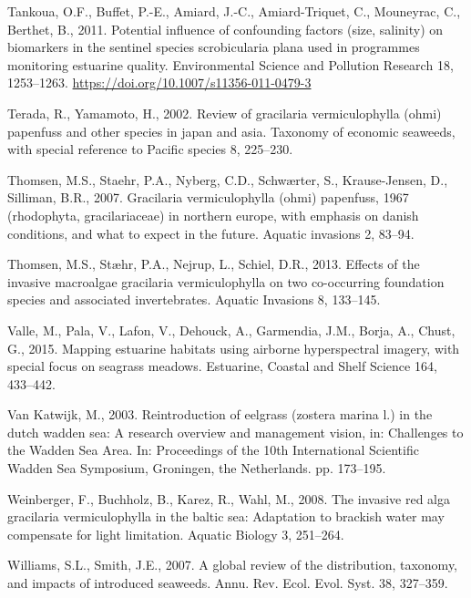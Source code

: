 \documentclass[
  letterpaper,
  DIV=11,
  numbers=noendperiod]{scrartcl}
\newlength{\cslhangindent}
\newenvironment{CSLReferences}[2] %
 {\begin{list}{}{%
  \setlength{\itemindent}{0pt}
  \setlength{\leftmargin}{0pt}
  \setlength{\parsep}{0pt}
  \ifodd #1
   \setlength{\leftmargin}{\cslhangindent}
   \setlength{\itemindent}{-1\cslhangindent}
  \fi
  \setlength{\itemsep}{#2\baselineskip}}}
 {\end{list}}
\begin{document}
\begin{CSLReferences}{1}{0}
Tankoua, O.F., Buffet, P.-E., Amiard, J.-C., Amiard-Triquet, C.,
Mouneyrac, C., Berthet, B., 2011. Potential influence of confounding
factors (size, salinity) on biomarkers in the sentinel species
scrobicularia plana used in programmes monitoring estuarine quality.
Environmental Science and Pollution Research 18, 1253--1263.
\url{https://doi.org/10.1007/s11356-011-0479-3}

Terada, R., Yamamoto, H., 2002. Review of gracilaria vermiculophylla
(ohmi) papenfuss and other species in japan and asia. Taxonomy of
economic seaweeds, with special reference to Pacific species 8,
225--230.

Thomsen, M.S., Staehr, P.A., Nyberg, C.D., Schwærter, S., Krause-Jensen,
D., Silliman, B.R., 2007. Gracilaria vermiculophylla (ohmi) papenfuss,
1967 (rhodophyta, gracilariaceae) in northern europe, with emphasis on
danish conditions, and what to expect in the future. Aquatic invasions
2, 83--94.

Thomsen, M.S., Stæhr, P.A., Nejrup, L., Schiel, D.R., 2013. Effects of
the invasive macroalgae gracilaria vermiculophylla on two co-occurring
foundation species and associated invertebrates. Aquatic Invasions 8,
133--145.

Valle, M., Pala, V., Lafon, V., Dehouck, A., Garmendia, J.M., Borja, A.,
Chust, G., 2015. Mapping estuarine habitats using airborne hyperspectral
imagery, with special focus on seagrass meadows. Estuarine, Coastal and
Shelf Science 164, 433--442.

Van Katwijk, M., 2003. Reintroduction of eelgrass (zostera marina l.) in
the dutch wadden sea: A research overview and management vision, in:
Challenges to the Wadden Sea Area. In: Proceedings of the 10th
International Scientific Wadden Sea Symposium, Groningen, the
Netherlands. pp. 173--195.

Weinberger, F., Buchholz, B., Karez, R., Wahl, M., 2008. The invasive
red alga gracilaria vermiculophylla in the baltic sea: Adaptation to
brackish water may compensate for light limitation. Aquatic Biology 3,
251--264.

Williams, S.L., Smith, J.E., 2007. A global review of the distribution,
taxonomy, and impacts of introduced seaweeds. Annu. Rev. Ecol. Evol.
Syst. 38, 327--359.


\end{CSLReferences}
\end{document}
